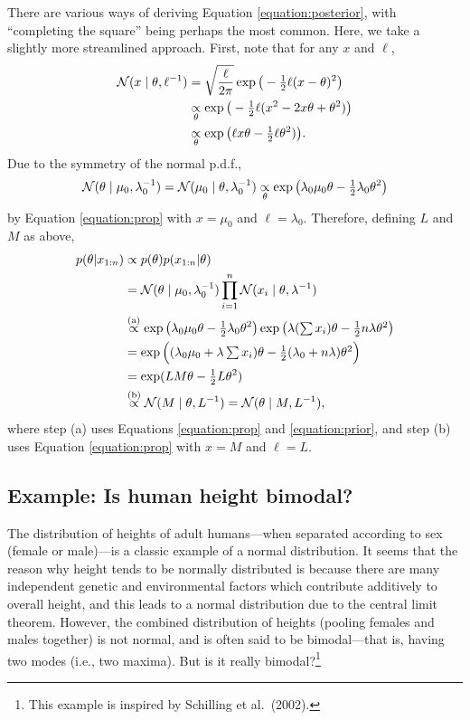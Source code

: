 \documentclass[12pt]{article}
\begin{document}
There are various ways of deriving Equation \ref{equation:posterior}, with ``completing the square'' being perhaps the most common. Here, we take a slightly more streamlined approach. First, note that for any $x$ and $\ell$,
\begin{align}
\mathcal{N}(x\mid\theta,\ell^{-1})
& =\sqrt{\frac{\ell}{2\pi}}\exp\big(-\tfrac{1}{2}\ell (x-\theta)^2\big)\notag\\
&\underset{\theta}{\propto} \exp\big(-\tfrac{1}{2}\ell (x^2 - 2 x \theta +\theta^2)\big)\notag\\
&\underset{\theta}{\propto} \exp\big(\ell x \theta -\tfrac{1}{2}\ell\theta^2)\big).\label{equation:prop}
\end{align}
Due to the symmetry of the normal p.d.f.,
\begin{align}\label{equation:prior}
\mathcal{N}(\theta\mid\mu_0,\lambda_0^{-1}) =\mathcal{N}(\mu_0\mid\theta,\lambda_0^{-1})
\underset{\theta}{\propto}\exp\big(\lambda_0\mu_0\theta-\tfrac{1}{2}\lambda_0\theta^2\big)
\end{align}
by Equation \ref{equation:prop} with $x=\mu_0$ and $\ell=\lambda_0$.
Therefore, defining $L$ and $M$ as above,
\begin{align*}
p(\theta|x_{1:n})&\propto p(\theta) p(x_{1:n}|\theta) \\
&= \mathcal{N}(\theta\mid\mu_0,\lambda_0^{-1})\prod_{i = 1}^n\mathcal{N}(x_i\mid \theta,\lambda^{-1})\\
&\overset{\text{(a)}}{\propto} \exp\big(\lambda_0\mu_0\theta-\tfrac{1}{2}\lambda_0\theta^2\big)
         \exp\big(\lambda (\textstyle\sum x_i) \theta -\tfrac{1}{2}n\lambda\theta^2\big)\\
&= \exp\Big((\lambda_0\mu_0+\lambda\textstyle\sum x_i)\theta-\tfrac{1}{2}(\lambda_0+ n\lambda)\theta^2\Big)\\
&= \exp(L M\theta-\tfrac{1}{2}L\theta^2)\\
&\overset{\text{(b)}}{\propto} \mathcal{N}(M\mid\theta,L^{-1}) =\mathcal{N}(\theta\mid M,L^{-1}),
\end{align*}
where step (a) uses Equations \ref{equation:prop} and \ref{equation:prior}, and step (b) uses Equation \ref{equation:prop} with $x=M$ and $\ell=L$.


\subsection{Example: Is human height bimodal?}

The distribution of heights of adult humans---when separated according to sex (female or male)---is a classic example of a normal distribution. It seems that the reason why height tends to be normally distributed is because there are many independent genetic and environmental factors which contribute additively to overall height, and this leads to a normal distribution due to the central limit theorem. However, the combined distribution of heights (pooling females and males together) is not normal, and is often said to be bimodal---that is, having two modes (i.e., two maxima). But is it really bimodal?\footnote{This example is inspired by Schilling et al.\ (2002).}
\end{document}
